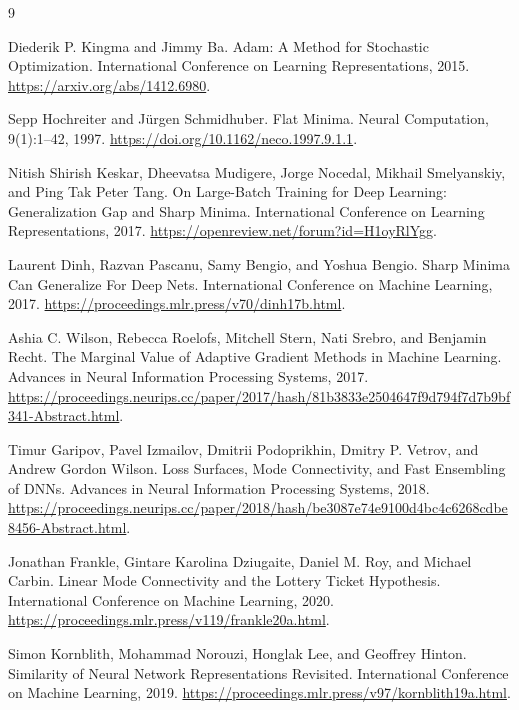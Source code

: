 \documentclass[11pt]{article}
\begin{document}
\begin{thebibliography}{9}

Diederik P. Kingma and Jimmy Ba.
\newblock Adam: A Method for Stochastic Optimization.
\newblock International Conference on Learning Representations, 2015.
\newblock \url{https://arxiv.org/abs/1412.6980}.

Sepp Hochreiter and J\"urgen Schmidhuber.
\newblock Flat Minima.
\newblock Neural Computation, 9(1):1--42, 1997.
\newblock \url{https://doi.org/10.1162/neco.1997.9.1.1}.

Nitish Shirish Keskar, Dheevatsa Mudigere, Jorge Nocedal, Mikhail Smelyanskiy, and Ping Tak Peter Tang.
\newblock On Large-Batch Training for Deep Learning: Generalization Gap and Sharp Minima.
\newblock International Conference on Learning Representations, 2017.
\newblock \url{https://openreview.net/forum?id=H1oyRlYgg}.

Laurent Dinh, Razvan Pascanu, Samy Bengio, and Yoshua Bengio.
\newblock Sharp Minima Can Generalize For Deep Nets.
\newblock International Conference on Machine Learning, 2017.
\newblock \url{https://proceedings.mlr.press/v70/dinh17b.html}.

Ashia C. Wilson, Rebecca Roelofs, Mitchell Stern, Nati Srebro, and Benjamin Recht.
\newblock The Marginal Value of Adaptive Gradient Methods in Machine Learning.
\newblock Advances in Neural Information Processing Systems, 2017.
\newblock \url{https://proceedings.neurips.cc/paper/2017/hash/81b3833e2504647f9d794f7d7b9bf341-Abstract.html}.

Timur Garipov, Pavel Izmailov, Dmitrii Podoprikhin, Dmitry P. Vetrov, and Andrew Gordon Wilson.
\newblock Loss Surfaces, Mode Connectivity, and Fast Ensembling of DNNs.
\newblock Advances in Neural Information Processing Systems, 2018.
\newblock \url{https://proceedings.neurips.cc/paper/2018/hash/be3087e74e9100d4bc4c6268cdbe8456-Abstract.html}.

Jonathan Frankle, Gintare Karolina Dziugaite, Daniel M. Roy, and Michael Carbin.
\newblock Linear Mode Connectivity and the Lottery Ticket Hypothesis.
\newblock International Conference on Machine Learning, 2020.
\newblock \url{https://proceedings.mlr.press/v119/frankle20a.html}.

Simon Kornblith, Mohammad Norouzi, Honglak Lee, and Geoffrey Hinton.
\newblock Similarity of Neural Network Representations Revisited.
\newblock International Conference on Machine Learning, 2019.
\newblock \url{https://proceedings.mlr.press/v97/kornblith19a.html}.

\end{thebibliography}
\end{document}
